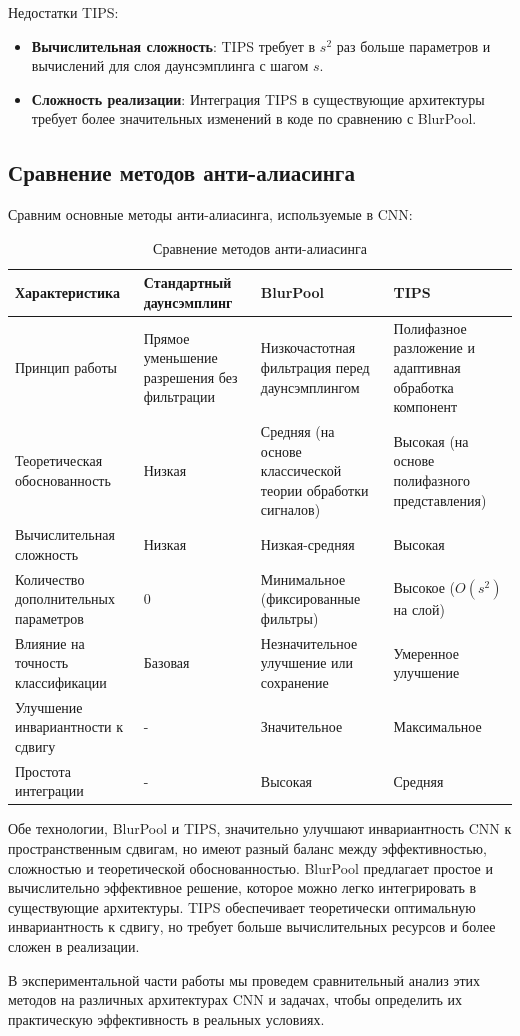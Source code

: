 Недостатки TIPS:

\begin{itemize}
    \item \textbf{Вычислительная сложность}: TIPS требует в $s^2$ раз больше параметров и вычислений для слоя даунсэмплинга с шагом $s$.
    
    \item \textbf{Сложность реализации}: Интеграция TIPS в существующие архитектуры требует более значительных изменений в коде по сравнению с BlurPool.
\end{itemize}

\subsection{Сравнение методов анти-алиасинга}
\label{theory:anti_aliasing:comparison}

Сравним основные методы анти-алиасинга, используемые в CNN:

\begin{table}[ht]
\centering
\caption{Сравнение методов анти-алиасинга}
\label{tab:antialiasing_comparison}
\begin{tabular}{|l|p{3.5cm}|p{3.5cm}|p{3.5cm}|}
\hline
\textbf{Характеристика} & \textbf{Стандартный даунсэмплинг} & \textbf{BlurPool} & \textbf{TIPS} \\ \hline
Принцип работы & Прямое уменьшение разрешения без фильтрации & Низкочастотная фильтрация перед даунсэмплингом & Полифазное разложение и адаптивная обработка компонент \\ \hline
Теоретическая обоснованность & Низкая & Средняя (на основе классической теории обработки сигналов) & Высокая (на основе полифазного представления) \\ \hline
Вычислительная сложность & Низкая & Низкая-средняя & Высокая \\ \hline
Количество дополнительных параметров & 0 & Минимальное (фиксированные фильтры) & Высокое ($O(s^2)$ на слой) \\ \hline
Влияние на точность классификации & Базовая & Незначительное улучшение или сохранение & Умеренное улучшение \\ \hline
Улучшение инвариантности к сдвигу & - & Значительное & Максимальное \\ \hline
Простота интеграции & - & Высокая & Средняя \\ \hline
\end{tabular}
\end{table}

Обе технологии, BlurPool и TIPS, значительно улучшают инвариантность CNN к пространственным сдвигам, но имеют разный баланс между эффективностью, сложностью и теоретической обоснованностью. BlurPool предлагает простое и вычислительно эффективное решение, которое можно легко интегрировать в существующие архитектуры. TIPS обеспечивает теоретически оптимальную инвариантность к сдвигу, но требует больше вычислительных ресурсов и более сложен в реализации.

В экспериментальной части работы мы проведем сравнительный анализ этих методов на различных архитектурах CNN и задачах, чтобы определить их практическую эффективность в реальных условиях.

